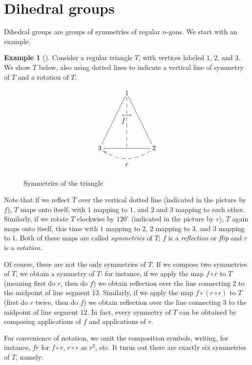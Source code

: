\documentclass[10pt,]{book}
\theoremstyle{plain}
\theoremstyle{definition}
\theoremstyle{definition}
\theoremstyle{definition}
\newtheorem{example}[theorem]{Example}
\theoremstyle{definition}
\numberwithin{equation}{section}
\begin{document}
\section[{Dihedral groups}]{Dihedral groups}\label{dihedralgps}
Dihedral groups are groups of symmetries of regular \(n\)-gons. We start with an example.%
\begin{example}[]\label{D3}
Consider a regular triangle \(T\), with vertices labeled \(1\), \(2\), and \(3\). We show \(T\) below, also using dotted lines to indicate a vertical line of symmetry of \(T\) and a rotation of \(T\).%
\begin{figure}
\centering
{
 \[\xymatrix{&1\ar@{-}[ldd]\ar@{-}[rdd]\ar@{--}[dd]\\ &\stackrel{\longleftrightarrow}{\hspace{-10pt}f} &
\\ 3\ar@{-}[rr]&&2\ar@{-->}@/^{15pt}/[ll]^{\begin{array}{ccc}&r& \end{array}}}\]
}
\caption{Symmetries of the triangle\label{figure-2}}
\end{figure}
Note that if we reflect \(T\) over the vertical dotted line (indicated in the picture by \(f\)), \(T\) maps onto itself, with \(1\) mapping to \(1\), and \(2\) and \(3\) mapping to each other. Similarly, if we rotate \(T\) clockwise by \(120^{\circ}\) (indicated in the picture by \(r\)), \(T\) again maps onto itself, this time with \(1\) mapping to \(2\), \(2\) mapping to \(3\), and \(3\) mapping to \(1\). Both of these maps are called \emph{symmetries} of \(T\); \(f\) is a \emph{reflection} or \emph{flip} and \(r\) is a \emph{rotation}.%
\par
Of course, these are not the only symmetries of \(T\). If we compose two symmetries of \(T\), we obtain a symmetry of \(T\): for instance, if we apply the map \(f\circ r\) to \(T\) (meaning first do \(r\), then do \(f\)) we obtain reflection over the line connecting \(2\) to the midpoint of line segment \(\overline{13}\). Similarly, if we apply the map \(f\circ (r\circ r)\) to \(T\) (first do \(r\) twice, then do \(f\)) we obtain reflection over the line connecting \(3\) to the midpoint of line segment \(\overline{12}\). In fact, every symmetry of \(T\) can be obtained by composing applications of \(f\) and applications of \(r\).%
\par
For convenience of notation, we omit the composition symbols, writing, for instance, \(fr\) for \(f\circ r\), \(r\circ r\) as \(r^2\), etc. It turns out there are exactly six symmetries of \(T\), namely: \leavevmode%

\end{example}
\end{document}
